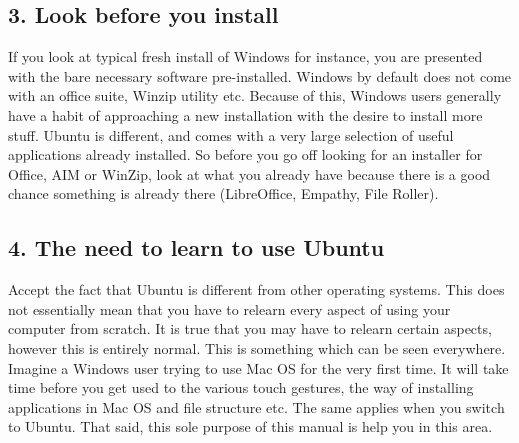 \subsection*{3. Look before you install}
If you look at typical fresh install of Windows for instance, you are presented with the bare necessary software pre-installed. Windows by default does not come with an office suite, Winzip utility etc. Because of this, Windows users generally have a habit of approaching a new installation with the desire to install more stuff. Ubuntu is different, and comes with a very large selection of useful applications already installed. So before you go off looking for an installer for Office, AIM or WinZip, look at what you already have because there is a good chance something is already there (LibreOffice, Empathy, File Roller).

\subsection*{4. The need to learn to use Ubuntu}
Accept the fact that Ubuntu is different from other operating systems. This does not essentially mean that you have to relearn every aspect of using your computer from scratch. It is true that you may have to relearn certain aspects, however this is entirely normal. This is something which can be seen everywhere. Imagine a Windows user trying to use Mac OS for the very first time. It will take time before you get used to the various touch gestures, the way of installing applications in Mac OS and file structure etc. The same applies when you switch to Ubuntu.  That said, this sole purpose of this manual is help you in this area. 
